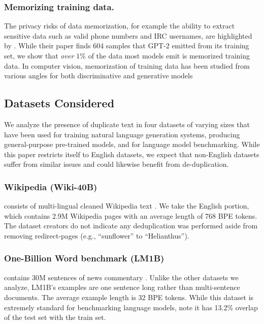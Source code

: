 \subsubsection{Memorizing training data.} The privacy risks of data memorization, for example the ability to extract sensitive data such as valid phone numbers and IRC usernames, are highlighted by
\citet{carlini2020extracting}.
%
While their paper finds 604 samples that GPT-2 emitted from its training set, we show that \emph{over $1\%$} of the data most models emit is memorized training data.
% 
In computer vision, memorization of training data has been studied from various angles for both discriminative and generative models~\citep[e.g.][]{arpit2017closer,8953411,feldman2020neural,stephenson2021geometry}

\subsection{Datasets Considered}
We analyze the presence of duplicate text in four datasets of varying sizes that have been used for training natural language generation systems, producing general-purpose pre-trained models, and for language model benchmarking.
While this paper restricts itself to English datasets, we expect that non-English datasets suffer from similar issues and could likewise benefit from de-duplication.

\subsubsection{Wikipedia (Wiki-40B)}
consists of multi-lingual cleaned Wikipedia text \citep{guo2020wiki40b}.
We take the English portion, which contains 2.9M Wikipedia pages with an average length of 768 BPE tokens.
The dataset creators do not indicate any deduplication was performed aside from removing redirect-pages (e.g., ``sunflower'' to ``Helianthus'').

\subsubsection{One-Billion Word benchmark (LM1B)}  contains 30M sentences of news commentary \citep{chelba2013one}.
Unlike the other datasets we analyze, LM1B's examples are one sentence long rather than multi-sentence documents.
The average example length is 32 BPE tokens.
While this dataset is extremely standard for benchmarking language models, \citet[Sec 4]{radford2019language} note it has 13.2\% overlap of the test set with the train set.

